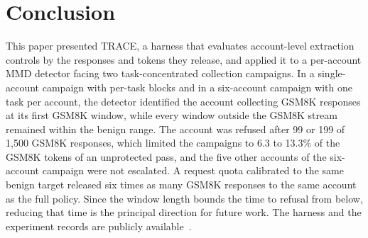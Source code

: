 \documentclass[conference]{IEEEtran}
\begin{document}
\section{Conclusion}
\label{sec:conclusion}
This paper presented TRACE, a harness that evaluates account-level extraction controls by the responses and tokens they release, and applied it to a per-account MMD detector facing two task-concentrated collection campaigns. In a single-account campaign with per-task blocks and in a six-account campaign with one task per account, the detector identified the account collecting GSM8K responses at its first GSM8K window, while every window outside the GSM8K stream remained within the benign range. The account was refused after 99 or 199 of 1,500 GSM8K responses, which limited the campaigns to 6.3 to 13.3\% of the GSM8K tokens of an unprotected pass, and the five other accounts of the six-account campaign were not escalated. A request quota calibrated to the same benign target released six times as many GSM8K responses to the same account as the full policy. Since the window length bounds the time to refusal from below, reducing that time is the principal direction for future work. The harness and the experiment records are publicly available~\cite{trace2026artifact}.



\end{document}
